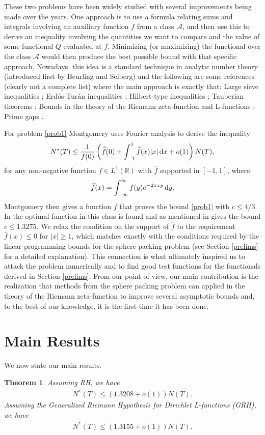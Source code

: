 \documentclass[reqno]{amsart}
\let\Horig\H
\newtheorem{theorem}{Theorem}
\newcommand{\A}{\mathcal{A}}
\renewcommand{\H}{\mathcal{H}}
\renewcommand{\r}{\mathbb{R}}
\newcommand{\ft}{\widehat}
\renewcommand{\d}{\,\text{\rm d}}
\begin{document}
These two problems have been widely studied with several improvements being made over the years. One approach is to use a formula relating sums and integrals involving an auxiliary function $f$ from a class $\A$, and then use this to derive an inequality involving the quantities we want to compare and the value of some functional $Q$ evaluated at $f$. Minimizing (or maximizing) the functional over the class $\A$ would then produce the best possible bound with that specific approach. Nowadays, this idea is a standard technique in analytic number theory (introduced first by Beurling and Selberg) and the following are some references (clearly not a complete list) where the main approach is exactly that: Large sieve inequalities \cite{GV, HV}; Erd\Horig{o}s-Tur\'{a}n inequalities \cite{CV2, Va}; Hilbert-type inequalities \cite{CL3, CLV, CV2, GMK, GV, Va}; Tauberian theorems \cite{GV}; Bounds in the theory of the Riemann zeta-function and L-functions \cite{CC,CChi,CChiM,CCLM,CCM,CCM2,CF,CS,Chi,Ga,GG}; Prime gaps \cite{CMS}.

For problem \eqref{prob1} Montgomery \cite{M} uses Fourier analysis to derive the inequality
\[
N^*(T) \leq \frac{1}{f(0)}\left( \widehat f(0) + \int_{-1}^1 \widehat f(x) |x| \d x + o(1) \right) N(T),
\]
for any non-negative function $f \in L^1(\r)$ with $\ft f$ supported in $[-1,1]$, where
\[
\widehat f(x) = \int_{-\infty}^{\infty} f(y) e^{-2\pi xy} \d y.
\]
Montgomery then gives a function $f$ that proves the bound \eqref{prob1} with $c \leq 4/3$. In \cite{MT} the optimal function in this class is found and as mentioned in \cite{CG} gives the bound $c \le 1.3275$. We relax the condition on the support of $\ft f$ to the requirement $\ft f(x) \le 0$ for $|x| \ge 1$, which matches exactly with the conditions required by the linear programming bounds for the sphere packing problem (see Section \ref{prelims} for a detailed explanation). This connection is what ultimately inspired us to attack the problem numerically and to find good test functions for the functionals derived in Section \ref{prelims}. From our point of view, our main contribution is the realization that methods from the sphere packing problem can applied in the theory of the Riemann zeta-function to improve several asymptotic bounds and, to the best of our knowledge, it is the first time it has been done.
\newpage

\section{Main Results}
We now state our main results.
\begin{theorem} \label{thmNstar}
	Assuming RH, we have
	\begin{align*}
	N^*(T)\leq ({1.3208}+o(1))N(T).
	\end{align*}
	Assuming the Generalized Riemann Hypothesis for Dirichlet L-functions (GRH), we have
	\begin{align*}
	N^*(T)\leq ({1.3155}+o(1))N(T).
	\end{align*}
\end{theorem}
\end{document}
